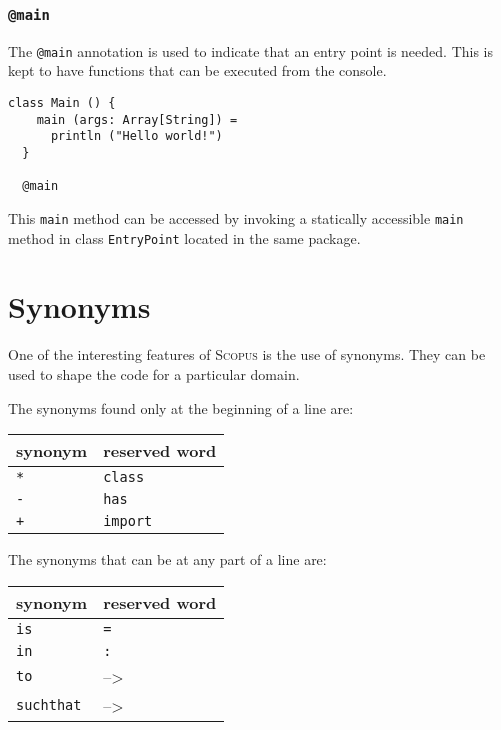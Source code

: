 \documentclass[12pt,a4paper]{book}
\makeatletter
\newcommand{\srccode}[1]{\texttt{{#1}}}
\newcommand{\reservedWord}[1]{{\color{blue}\srccode{#1}}\xspace}
\newcommand{\annotation}[1]{{\color{brown}\srccode{#1}}\xspace}
\newcommand{\sdef}{\srccode{=}}
\newcommand{\scolon}{\srccode{:}}
\newcommand{\sclass}{\reservedWord{class}}
\newcommand{\shas}{\reservedWord{has}}
\newcommand{\simport}{\reservedWord{import}}
\newcommand{\smain}{\annotation{@main}}
\newcommand{\sasterisk}{\srccode{*}}
\newcommand{\splus}{\srccode{+}}
\newcommand{\sminus}{\srccode{-}}
\newcommand{\sis}{\reservedWord{is}}
\newcommand{\scin}{\reservedWord{in}}
\newcommand{\sto}{\reservedWord{to}}
\newcommand{\ssuchthat}{\reservedWord{suchthat}}
\newcommand{\Scopus}{\textsc{Scopus}\xspace}
\newcommand{\lambdaSymbol}{{\tiny--\textgreater}\xspace}
\makeatother
\begin{document}
    \subsubsection{\smain}

    The \smain annotation is used to indicate that an entry point is needed.
    This is kept to have functions that can be executed from the console.

    \begin{lstlisting}[label={lst:exampleMain}]
  class Main () {
    main (args: Array[String]) =
      println ("Hello world!")
  }

  @main
    \end{lstlisting}

    This \srccode{main} method can be accessed by invoking a statically accessible \srccode{main} method in class \srccode{EntryPoint} located in the same package.


    \section{Synonyms}

    One of the interesting features of \Scopus is the use of synonyms.
    They can be used to shape the code for a particular domain.

    The synonyms found only at the beginning of a line are:

    \begin{center}
        \begin{tabular}{|ll|}
            \hline
            \textbf{synonym} & \textbf{reserved word} \\
            \hline
            \sasterisk       & \sclass                \\
            \hline
            \sminus          & \shas                  \\
            \hline
            \splus           & \simport               \\
            \hline
        \end{tabular}
    \end{center}

    The synonyms that can be at any part of a line are:

    \begin{center}
        \begin{tabular}{|ll|}
            \hline
            \textbf{synonym} & \textbf{reserved word} \\
            \hline
            \sis             & \sdef                  \\
            \hline
            \scin            & \scolon                \\
            \hline
            \sto             & \lambdaSymbol          \\
            \ssuchthat       & \lambdaSymbol          \\
            \hline
        \end{tabular}
    \end{center}
\end{document}
